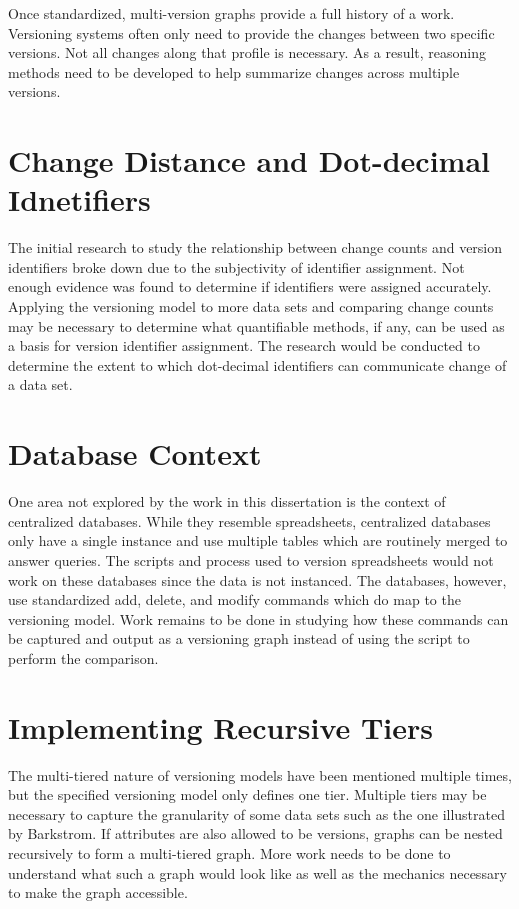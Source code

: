 Once standardized, multi-version graphs provide a full history of a work.
Versioning systems often only need to provide the changes between two specific versions.
Not all changes along that profile is necessary.
As a result, reasoning methods need to be developed to help summarize changes across multiple versions.

\section{Change Distance and Dot-decimal Idnetifiers}

The initial research to study the relationship between change counts and version identifiers broke down due to the subjectivity of identifier assignment.
Not enough evidence was found to determine if identifiers were assigned accurately.
Applying the versioning model to more data sets and comparing change counts may be necessary to determine what quantifiable methods, if any, can be used as a basis for version identifier assignment.
The research would be conducted to determine the extent to which dot-decimal identifiers can communicate change of a data set.

\section{Database Context}

One area not explored by the work in this dissertation is the context of centralized databases.
While they resemble spreadsheets, centralized databases only have a single instance and use multiple tables which are routinely merged to answer queries.
The scripts and process used to version spreadsheets would not work on these databases since the data is not instanced.
The databases, however, use standardized add, delete, and modify commands which do map to the versioning model.
Work remains to be done in studying how these commands can be captured and output as a versioning graph instead of using the script to perform the comparison.

\section{Implementing Recursive Tiers}

The multi-tiered nature of versioning models have been mentioned multiple times, but the specified versioning model only defines one tier.
Multiple tiers may be necessary to capture the granularity of some data sets such as the one illustrated by Barkstrom.
If attributes are also allowed to be versions, graphs can be nested recursively to form a multi-tiered graph.
More work needs to be done to understand what such a graph would look like as well as the mechanics necessary to make the graph accessible.

